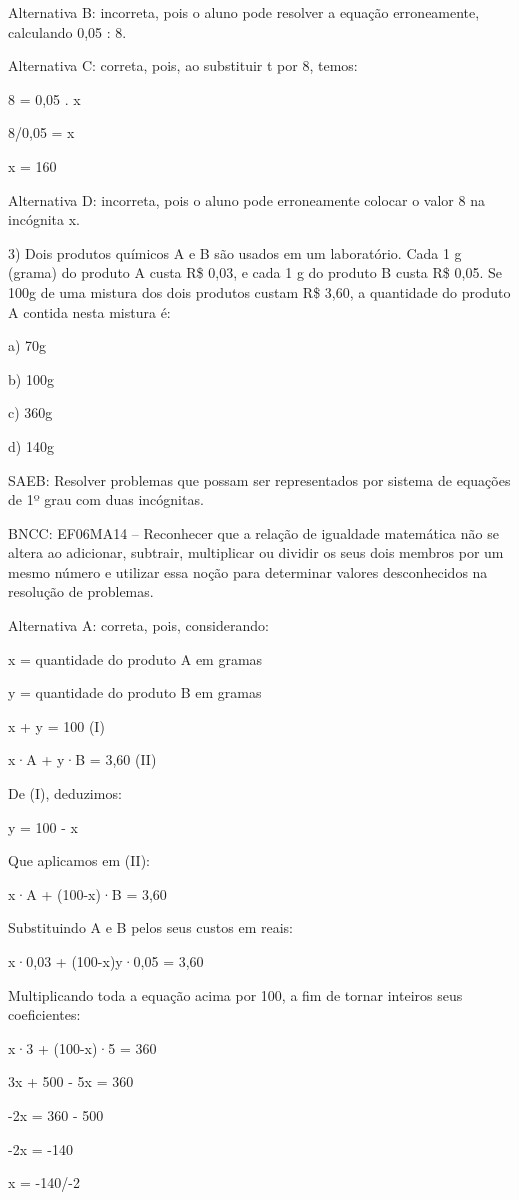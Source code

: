 Alternativa B: incorreta, pois o aluno pode resolver a equação
erroneamente, calculando 0,05 : 8.

Alternativa C: correta, pois, ao substituir t por 8, temos:

8 = 0,05 . x

8/0,05 = x

x = 160

Alternativa D: incorreta, pois o aluno pode erroneamente colocar o valor
8 na incógnita x.

3) Dois produtos químicos A e B são usados em um laboratório. Cada 1 g
(grama) do produto A custa R\$ 0,03, e cada 1 g do produto B custa R\$
0,05. Se 100g de uma mistura dos dois produtos custam R\$ 3,60, a
quantidade do produto A contida nesta mistura é:

a) 70g

b) 100g

c) 360g

d) 140g

SAEB: Resolver problemas que possam ser representados por sistema de
equações de 1º grau com duas incógnitas.

BNCC: EF06MA14 -- Reconhecer que a relação de igualdade matemática não
se altera ao adicionar, subtrair, multiplicar ou dividir os seus dois
membros por um mesmo número e utilizar essa noção para determinar
valores desconhecidos na resolução de problemas.

Alternativa A: correta, pois, considerando:

x = quantidade do produto A em gramas

y = quantidade do produto B em gramas

x + y = 100 (I)

x·A + y·B = 3,60 (II)

De (I), deduzimos:

y = 100 - x

Que aplicamos em (II):

x·A + (100-x)·B = 3,60

Substituindo A e B pelos seus custos em reais:

x·0,03 + (100-x)y·0,05 = 3,60

Multiplicando toda a equação acima por 100, a fim de tornar inteiros
seus coeficientes:

x·3 + (100-x)·5 = 360

3x + 500 - 5x = 360

-2x = 360 - 500

-2x = -140

x = -140/-2

